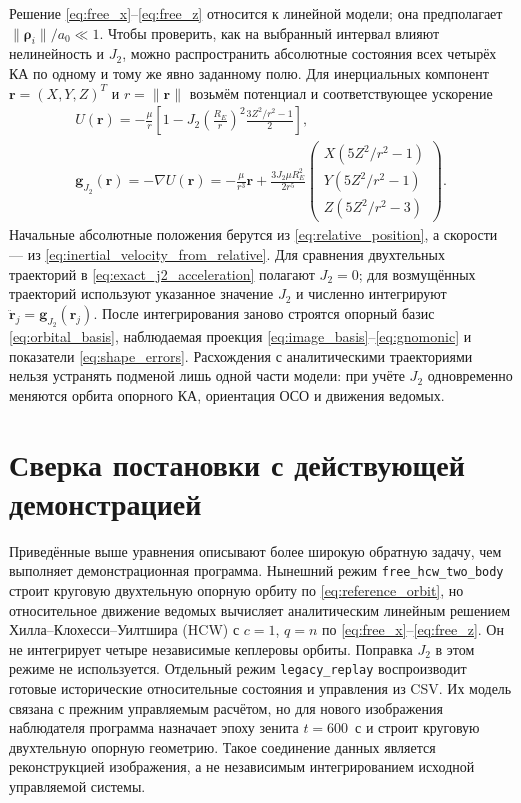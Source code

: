 \documentclass[a4paper,12pt]{article}
\begin{document}
Решение \eqref{eq:free_x}--\eqref{eq:free_z} относится к
линейной модели; она предполагает
$\|\boldsymbol\rho_i\|/a_0\ll1$. Чтобы проверить, как на
выбранный интервал влияют нелинейность и $J_2$, можно
распространить абсолютные состояния всех четырёх КА
по одному и тому же явно заданному полю. Для инерциальных
компонент $\mathbf r=(X,Y,Z)^T$ и $r=\|\mathbf r\|$ возьмём
потенциал и соответствующее ускорение
\begin{equation}
\begin{gathered}
 U(\mathbf r)=-\frac{\mu}{r}
   \left[1-J_2\left(\frac{R_E}{r}\right)^2
                 \frac{3Z^2/r^2-1}{2}\right],\\
 \mathbf g_{J_2}(\mathbf r)=-\nabla U(\mathbf r)
 =-\frac{\mu}{r^3}\mathbf r+
   \frac{3J_2\mu R_E^2}{2r^5}
   \begin{pmatrix}
    X(5Z^2/r^2-1)\\
    Y(5Z^2/r^2-1)\\
    Z(5Z^2/r^2-3)
   \end{pmatrix}.
\end{gathered}
\label{eq:exact_j2_acceleration}
\end{equation}
Начальные абсолютные положения берутся из
\eqref{eq:relative_position}, а скорости --- из
\eqref{eq:inertial_velocity_from_relative}. Для сравнения
двухтельных траекторий в
\eqref{eq:exact_j2_acceleration} полагают $J_2=0$;
для возмущённых траекторий используют указанное значение
$J_2$ и численно интегрируют
$\ddot{\mathbf r}_j=\mathbf g_{J_2}(\mathbf r_j)$.
После интегрирования заново строятся опорный базис
\eqref{eq:orbital_basis}, наблюдаемая проекция
\eqref{eq:image_basis}--\eqref{eq:gnomonic} и показатели
\eqref{eq:shape_errors}. Расхождения с аналитическими
траекториями нельзя устранять подменой лишь одной части
модели: при учёте $J_2$ одновременно меняются орбита
опорного КА, ориентация ОСО и движения ведомых.

\section{Сверка постановки с действующей демонстрацией}
\label{sec:implementation}

Приведённые выше уравнения описывают более широкую обратную
задачу, чем выполняет демонстрационная программа. Нынешний режим
\texttt{free\_hcw\_two\_body} строит круговую двухтельную
опорную орбиту по \eqref{eq:reference_orbit}, но относительное
движение ведомых вычисляет аналитическим линейным решением
Хилла--Клохесси--Уилтшира (HCW) с $c=1$, $q=n$ по
\eqref{eq:free_x}--\eqref{eq:free_z}. Он не интегрирует четыре
независимые кеплеровы орбиты. Поправка $J_2$ в этом режиме
не используется. Отдельный режим \texttt{legacy\_replay}
воспроизводит готовые исторические относительные состояния и
управления из CSV. Их модель связана с прежним управляемым расчётом,
но для нового изображения наблюдателя программа назначает эпоху
зенита $t=600$~с и строит круговую двухтельную опорную геометрию.
Такое соединение данных является реконструкцией изображения,
а не независимым интегрированием исходной управляемой системы.
\end{document}
